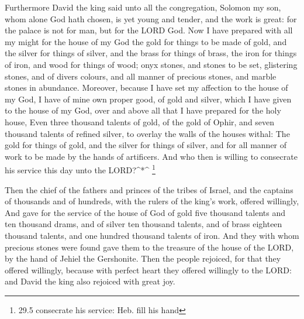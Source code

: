  Furthermore David the king said unto all the congregation,
Solomon my son, whom alone God hath chosen, is yet young and tender, and
the work is great: for the palace is not for man, but for the LORD God.
 Now I have prepared with all my might for the house of my
God the gold for things to be made of gold, and the silver for things of
silver, and the brass for things of brass, the iron for things of iron,
and wood for things of wood; onyx stones, and stones to be set,
glistering stones, and of divers colours, and all manner of precious
stones, and marble stones in abundance.  Moreover, because I
have set my affection to the house of my God, I have of mine own proper
good, of gold and silver, which I have given to the house of my God,
over and above all that I have prepared for the holy house, 
Even three thousand talents of gold, of the gold of Ophir, and seven
thousand talents of refined silver, to overlay the walls of the houses
withal:  The gold for things of gold, and the silver for
things of silver, and for all manner of work to be made by the hands of
artificers. And who then is willing to consecrate his service this day
unto the LORD?\^{}*\^{} \footnote{29.5 consecrate his service: Heb. fill
  his hand}

 Then the chief of the fathers and princes of the tribes of
Israel, and the captains of thousands and of hundreds, with the rulers
of the king's work, offered willingly,  And gave for the
service of the house of God of gold five thousand talents and ten
thousand drams, and of silver ten thousand talents, and of brass
eighteen thousand talents, and one hundred thousand talents of iron.
 And they with whom precious stones were found gave them to
the treasure of the house of the LORD, by the hand of Jehiel the
Gershonite.  Then the people rejoiced, for that they offered
willingly, because with perfect heart they offered willingly to the
LORD: and David the king also rejoiced with great joy.


